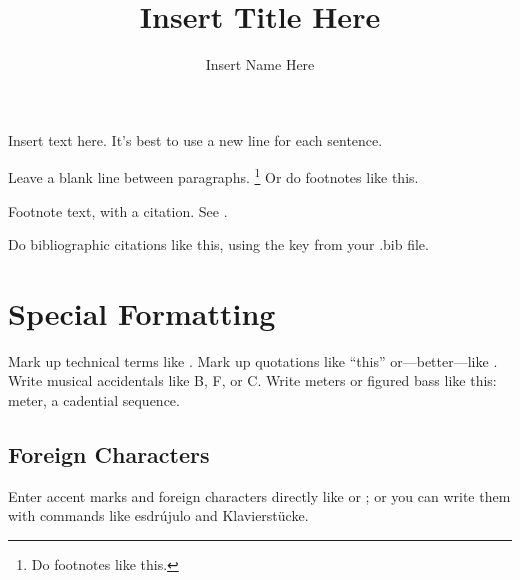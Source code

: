 \documentclass{usc-muhl-article}
\title{Insert Title Here} %
\author{Insert Name Here}
\begin{document}
\maketitle

Insert text here.
It's best to use a new line for each sentence.

Leave a blank line between paragraphs.%
  \footnote{Do footnotes like this.} 
Or do footnotes like this.%
  \begin{Footnote}
  Footnote text, with a citation. See \autocite{Robertson:PaleFace}.
  \end{Footnote}
Do bibliographic citations like this, using the key from your .bib file.%
  \autocite{Britten:Aspen} 

\section{Special Formatting}

Mark up technical terms like .
Mark up quotations like ``this'' or---better---like .
Write musical accidentals like B\fl{}, F\na{}, or C\sh{}.
Write meters or figured bass like this:  meter, a  cadential sequence.

\subsection{Foreign Characters}

Enter accent marks and foreign characters directly like  or ; or you can write them with commands like esdr\'ujulo and Klavierst\"ucke.

\printbibliography
\end{document}
